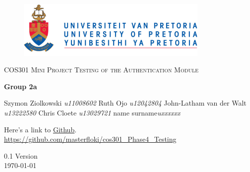 \begin{titlepage}
	\begin{center}
		
		\begin{figure}[t]
			\centering
			\includegraphics[width=350px]{UP_Logo.png}
		\end{figure}
		
		\textsc{\LARGE COS301 Mini Project \newline\newline Testing of the Authentication Module}
		
		\textbf{\newline Group 2a} \\
		\begin{flushright} \large
			Szymon Ziolkowski \emph{u11008602} \newline
			Ruth Ojo \emph{u12042804} \newline
			John-Latham van der Walt \emph{u13222580} \newline
			Chris Cloete \emph{u13029721} \newline
			name surname\emph{uxxxxxx} \newline
		\end{flushright}
		
		\vfill
		
	Here's a link to \href{https://github.com/masterfloki/cos301_Phase4_Testing}{Github}.\\
	\url{https://github.com/masterfloki/cos301_Phase4_Testing}

	\vfill

	{\large 0.1 Version}
	\\
	{\large \today}		
		
		
	\end{center}
\end{titlepage}
